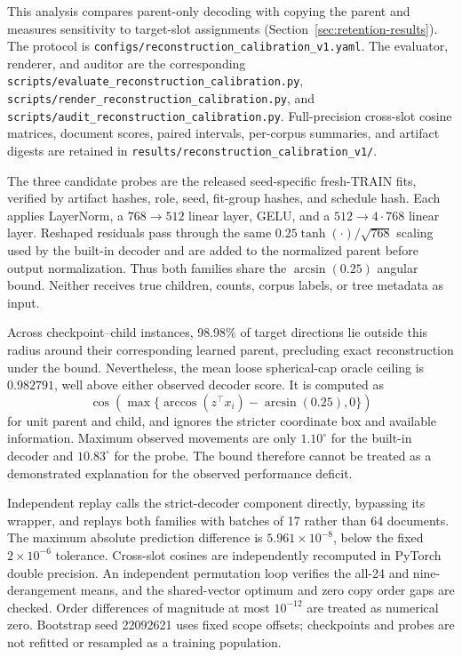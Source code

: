 \documentclass[10pt]{article}
\begin{document}
This analysis compares parent-only decoding with copying the parent and
measures sensitivity to target-slot assignments
(Section~\ref{sec:retention-results}). The protocol is
\nolinkurl{configs/reconstruction_calibration_v1.yaml}.
The evaluator, renderer, and auditor are the corresponding
\nolinkurl{scripts/evaluate_reconstruction_calibration.py},
\nolinkurl{scripts/render_reconstruction_calibration.py}, and
\nolinkurl{scripts/audit_reconstruction_calibration.py}. Full-precision
cross-slot cosine matrices, document scores, paired intervals, per-corpus
summaries, and artifact digests are retained in
\nolinkurl{results/reconstruction_calibration_v1/}.

The three candidate probes are the released seed-specific fresh-TRAIN fits,
verified by artifact hashes, role, seed, fit-group hashes, and schedule hash.
Each applies LayerNorm, a \(768\to512\) linear layer, GELU, and a
\(512\to4\cdot768\) linear layer. Reshaped residuals pass through the same
\(0.25\tanh(\cdot)/\sqrt{768}\) scaling used by the built-in decoder and are
added to the normalized parent before output normalization. Thus both families
share the \(\arcsin(0.25)\) angular bound. Neither receives true children,
counts, corpus labels, or tree metadata as input.

Across checkpoint--child instances, 98.98\% of target directions lie outside
this radius around their corresponding learned parent, precluding exact
reconstruction under the bound. Nevertheless, the mean loose spherical-cap
oracle ceiling is \(0.982791\), well above either observed decoder score.
It is computed as
\[
 \cos\!\left(\max\{\arccos(z^\top x_i)-\arcsin(0.25),0\}\right)
\]
for unit parent and child, and ignores the stricter coordinate box and available
information. Maximum observed movements are only \(1.10^\circ\) for the built-in
decoder and \(10.83^\circ\) for the probe. The bound therefore cannot be treated
as a demonstrated explanation for the observed performance deficit.

Independent replay calls the strict-decoder component directly, bypassing its
wrapper, and replays both families with batches of 17 rather than 64 documents.
The maximum absolute prediction difference is \(5.961\times10^{-8}\), below
the fixed \(2\times10^{-6}\) tolerance. Cross-slot cosines are independently
recomputed in PyTorch double precision. An independent permutation loop verifies
the all-24 and nine-derangement means, and the shared-vector optimum and zero
copy order gaps are checked. Order differences of magnitude at most
\(10^{-12}\) are treated as numerical zero. Bootstrap seed 22092621 uses fixed
scope offsets; checkpoints and probes are not refitted or resampled as a
training population.
\end{document}
